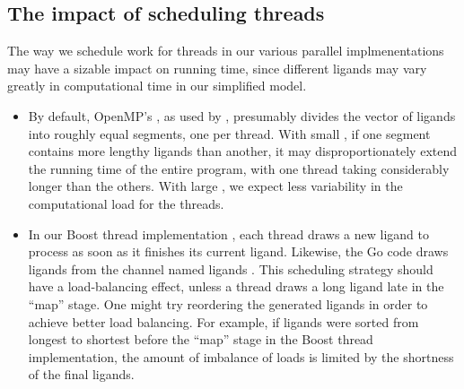 \documentclass[letterpaper,10pt,openany,oneside]{sphinxmanual}
\begin{document}
\subsection{The impact of scheduling threads}
\label{evaluation/evaluation:the-impact-of-scheduling-threads}
The way we schedule work for threads in our various parallel implmenentations may have a sizable impact on running time, since different ligands may vary greatly in computational time in our simplified model.
\begin{itemize}
\item {} 
By default, OpenMP’s , as used by , presumably divides the vector of ligands into roughly equal segments, one per thread. With small , if one segment contains more lengthy ligands than another, it may disproportionately extend the running time of the entire program, with one thread taking considerably longer than the others. With large , we expect less variability in the computational load for the threads.

\item {} 
In our Boost thread implementation , each thread draws a new ligand to process as soon as it finishes its current ligand. Likewise, the Go code  draws ligands from the channel named  ligands . This scheduling strategy should have a load-balancing effect, unless a thread draws a long ligand late in the “map” stage. One might try reordering the generated ligands in order to achieve better load balancing. For example, if ligands were sorted from longest to shortest before the “map” stage in the Boost thread implementation, the amount of imbalance of loads is limited by the shortness of the final ligands.

\end{itemize}
\end{document}
